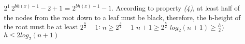 \documentclass[14pt]{article}
\begin{document}
$2^1 \ 2^{bh(x) - 1} - 2 + 1$ = $2^{bh(x) - 1}- 1$. \newline \newline
According to property \textit{(4)}, at least half of the nodes from the root down to a leaf must be black,
therefore, the b-height of the root must be at least $2^{\frac{h}{2}} - 1$: \newline
$n \geq 2^{\frac{h}{2}} - 1$ \newline \newline
$n + 1 \geq 2^{\frac{h}{2}}$ \newline \newline
$log_2(n + 1) \geq \frac{h}{2})$ \newline \newline
\textbf{$h \leq 2 log_2(n + 1)$}
\end{document}
